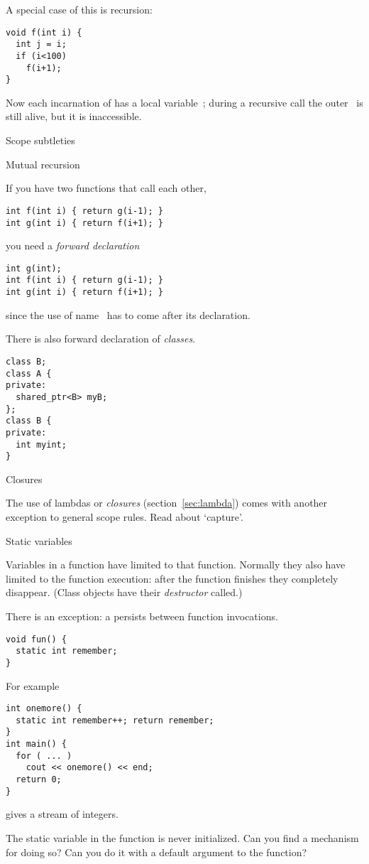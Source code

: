 A special case of this is recursion:
\begin{lstlisting}
void f(int i) {
  int j = i;
  if (i<100)
    f(i+1);
}
\end{lstlisting}
Now each incarnation of  has a local variable~; during a
recursive call the outer~ is still alive, but it is inaccessible.

 {Scope subtleties}

 {Mutual recursion}

If you have two functions  that call each other,
\begin{lstlisting}
int f(int i) { return g(i-1); }
int g(int i) { return f(i+1); }
\end{lstlisting}
you need a
%
\emph{forward declaration}
%
\begin{lstlisting}
int g(int);
int f(int i) { return g(i-1); }
int g(int i) { return f(i+1); }
\end{lstlisting}
since the use of name~ has to come after its declaration.

There is also forward declaration of
%
\emph{classes}.
\begin{lstlisting}
class B;
class A {
private:
  shared_ptr<B> myB;
};
class B {
private:
  int myint;
}
\end{lstlisting}

 {Closures}

The use of 
%
lambdas
or
%
\emph{closures} (section~\ref{sec:lambda}) comes with
another exception to general scope rules. Read about `capture'.

 {Static variables}
\label{sec:static-scope}

Variables in a function have  limited to
that function. Normally they also have 
limited to the function execution: after the function finishes they
completely disappear. (Class objects have their
%
\emph{destructor}
called.)

There is an exception: a  persists
between function invocations.
\begin{lstlisting}
void fun() {
  static int remember;
}
\end{lstlisting}
For example
\begin{lstlisting}
int onemore() {
  static int remember++; return remember;
}
int main() {
  for ( ... )
    cout << onemore() << end;
  return 0;
}
\end{lstlisting}
gives a stream of integers.
\begin{exercise}
  The static variable in the  function is never
  initialized. Can you find a mechanism for doing so?
  Can you do it with a default argument to the function?
\end{exercise}

